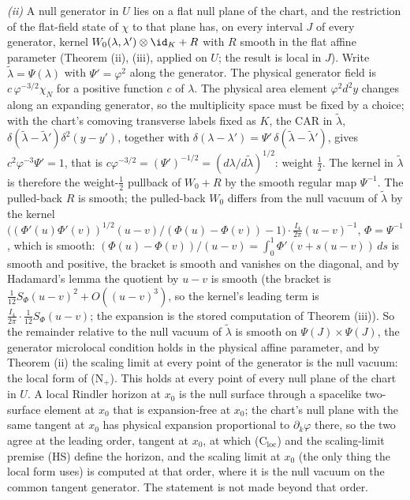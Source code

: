 \emph{(ii)} A null generator in $U$ lies on a flat null plane of the chart, and the restriction of the flat-field state of $\chi$ to that plane has, on every interval $J$ of every generator, kernel $W_{0}(\lambda, \lambda')\otimes\id_{K} + R$ with $R$ smooth in the flat affine parameter (Theorem (ii), (iii), applied on $U$; the result is local in $J$). Write $\tilde\lambda = \Psi(\lambda)$ with $\Psi' = \varphi^{2}$ along the generator. The physical generator field is $c\,\varphi^{-3/2}\chi_{N}$ for a positive function $c$ of $\lambda$. The physical area element $\varphi^{2}d^{2}y$ changes along an expanding generator, so the multiplicity space must be fixed by a choice; with the chart's comoving transverse labels fixed as $K$, the CAR in $\tilde\lambda$, $\delta(\tilde\lambda - \tilde\lambda')\delta^{2}(y - y')$, together with $\delta(\lambda - \lambda') = \Psi'\,\delta(\tilde\lambda - \tilde\lambda')$, gives $c^{2}\varphi^{-3}\Psi' = 1$, that is $c\varphi^{-3/2} = (\Psi')^{-1/2} = (d\lambda/d\tilde\lambda)^{1/2}$: weight $\tfrac12$. The kernel in $\tilde\lambda$ is therefore the weight-$\tfrac12$ pullback of $W_{0} + R$ by the smooth regular map $\Psi^{-1}$. The pulled-back $R$ is smooth; the pulled-back $W_{0}$ differs from the null vacuum of $\tilde\lambda$ by the kernel $\bigl((\Phi'(u)\Phi'(v))^{1/2}(u - v)/(\Phi(u) - \Phi(v)) - 1\bigr)\cdot\tfrac{I_{4}}{2\pi}(u - v)^{-1}$, $\Phi = \Psi^{-1}$, which is smooth: $(\Phi(u) - \Phi(v))/(u - v) = \int_{0}^{1}\Phi'(v + s(u - v))\,ds$ is smooth and positive, the bracket is smooth and vanishes on the diagonal, and by Hadamard's lemma the quotient by $u - v$ is smooth (the bracket is $\tfrac{1}{12}S_{\Phi}(u - v)^{2} + O((u - v)^{3})$, so the kernel's leading term is $\tfrac{I_{4}}{2\pi}\cdot\tfrac{1}{12}S_{\Phi}(u - v)$; the expansion is the stored computation of Theorem (iii)). So the remainder relative to the null vacuum of $\tilde\lambda$ is smooth on $\Psi(J)\times\Psi(J)$, the generator microlocal condition holds in the physical affine parameter, and by Theorem (ii) the scaling limit at every point of the generator is the null vacuum: the local form of (N$_{+}$). This holds at every point of every null plane of the chart in $U$. A local Rindler horizon at $x_{0}$ is the null surface through a spacelike two-surface element at $x_{0}$ that is expansion-free at $x_{0}$; the chart's null plane with the same tangent at $x_{0}$ has physical expansion proportional to $\partial_{k}\varphi$ there, so the two agree at the leading order, tangent at $x_{0}$, at which (C$_{\mathrm{loc}}$) and the scaling-limit premise (HS) define the horizon, and the scaling limit at $x_{0}$ (the only thing the local form uses) is computed at that order, where it is the null vacuum on the common tangent generator. The statement is not made beyond that order.

